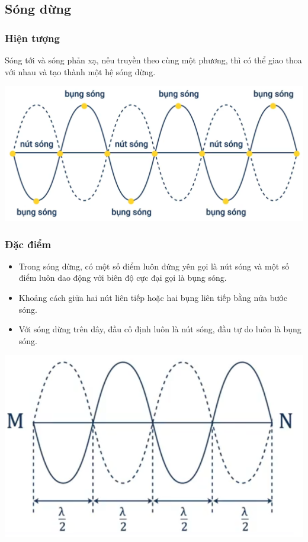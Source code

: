 \subsection{Sóng dừng}
\subsubsection{Hiện tượng }
Sóng tới và sóng phản xạ, nếu truyền theo cùng một phương, thì có thể giao thoa với nhau và tạo thành một hệ sóng dừng.
\begin{center}
	\includegraphics[scale=0.3]{../figs/VN12-PH-12-L-007-1-V2-3.png}
\end{center}	
\subsubsection{Đặc điểm}
\begin{itemize}	
	\item Trong sóng dừng, có một số điểm luôn đứng yên gọi là nút sóng và một số điểm luôn dao động với biên độ cực đại gọi là bụng sóng. 
	\item Khoảng cách giữa hai nút liên tiếp hoặc hai bụng liên tiếp bằng nửa bước sóng.
	\item Với sóng dừng trên dây, đầu cố định luôn là nút sóng, đầu tự do luôn là bụng sóng.
\end{itemize}
\begin{center}
	\includegraphics[scale=0.6]{../figs/VN12-PH-12-L-007-1-V2-4.png}
\end{center}
